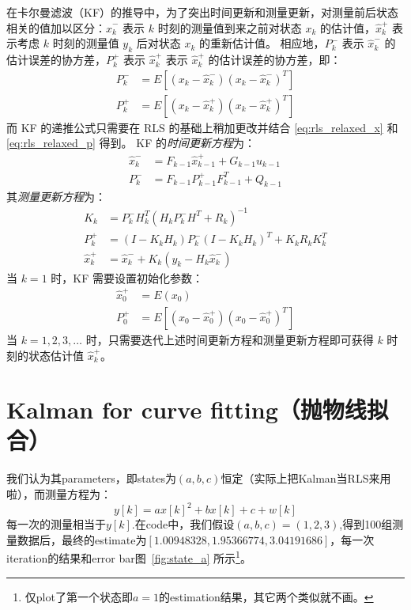 \documentclass[UTF8]{ctexart}
\begin{document}
在卡尔曼滤波（KF）的推导中，为了突出时间更新和测量更新，对测量前后状态相关的值加以区分：$\hat{x}_k^-$ 表示 $k$ 时刻的测量值到来之前对状态 $x_k$ 的估计值，$\hat{x}_k^+$ 表示考虑 $k$ 时刻的测量值 $y_k$ 后对状态 $x_k$ 的重新估计值。
相应地，$P_k^-$ 表示 $\hat{x}_k^-$ 的估计误差的协方差，$P_k^+$  表示 $\hat{x}_k^+$ 表示 $\hat{x}_k^+$ 的估计误差的协方差，即：
\begin{align}
  P_k^-&=E[(x_k-\hat{x}_k^-)(x_k-\hat{x}_k^-)^T]\\ 
  P_k^+&=E[(x_k-\hat{x}_k^+)(x_k-\hat{x}_k^+)^T] 
\end{align}
而 KF 的递推公式只需要在 RLS 的基础上稍加更改并结合 \eqref{eq:rls_relaxed_x} 和 \eqref{eq:rls_relaxed_p} 得到。
KF 的\emph{时间更新方程}为：
\begin{align}
  \hat{x}_k^- &=F_{k-1}\hat{x}_{k-1}^++G_{k-1}u_{k-1}\\
  P_{k}^- &=F_{k-1}P_{k-1}^+F_{k-1}^T+Q_{k-1}       
\end{align}
其\emph{测量更新方程}为：
\begin{align}
  K_k&=P_{k}^-H^T_k(H_kP_{k}^-H^T+R_k)^{-1} \\
  P_k^+&=(I-K_kH_k)P_{k}^-(I-K_kH_k)^T+K_kR_kK_k^T\\
  \hat{x}_k^+ &=\hat{x}_{k}^-+K_k(y_k-H_k\hat{x}_{k}^-)
\end{align}
当 $k=1$ 时，KF 需要设置初始化参数：
\begin{align}
  \hat{x}_0^+&=E(x_0)\\
  P_0^+&=E[(x_0-\hat{x}_0^+)(x_0-\hat{x}_0^+)^T] 
\end{align}
当 $k=1,2,3,\ldots$ 时，只需要迭代上述时间更新方程和测量更新方程即可获得 $k$ 时刻的状态估计值  $\hat{x}_k^+$。

\section{Kalman for curve fitting（抛物线拟合）}
\label{sec-3}
我们认为其parameters，即states为\((a,b,c)\)恒定（实际上把Kalman当RLS来用啦），而测量方程为：
\begin{equation}
y[k]=ax[k]^2+bx[k]+c+w[k]
\end{equation}
每一次的测量相当于\(y[k]\).在code中，我们假设\((a,b,c)=(1, 2, 3)\),得到100组测量数据后，最终的estimate为\([ 1.00948328,1.95366774,3.04191686]\)，每一次iteration的结果和error bar图~\ref{fig:state_a} 所示\footnote{仅plot了第一个状态即\(a=1\)的estimation结果，其它两个类似就不画。}。
\end{document}
